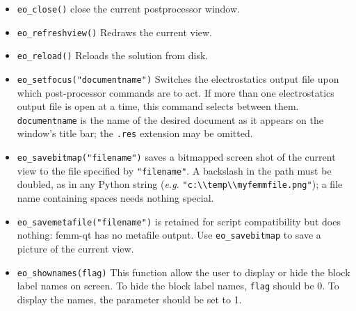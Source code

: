 \begin{itemize}

\item \texttt{eo\_close()} close the current postprocessor window.

\item{\tt eo\_refreshview()} Redraws the current view.

\item{\tt eo\_reload()} Reloads the solution from disk.
\item{\tt eo\_setfocus("documentname")} Switches the electrostatics output
file upon which post-processor commands are to act.  If more than one
electrostatics output file is open at a time, this command selects between them.
{\tt documentname} is the name of the desired document as it appears on the
window's title bar; the {\tt .res} extension may be omitted.

\item \texttt{eo\_savebitmap("filename")} saves a bitmapped screen shot of the current
view to the file specified by {\tt "filename"}.  A backslash in the path
must be doubled, as in any Python string ({\em e.g.}
\verb+"c:\\temp\\myfemmfile.png"+); a file name containing spaces needs
nothing special.
\item \texttt{eo\_savemetafile("filename")} is retained for script
compatibility but does nothing: femm-qt has no metafile output. Use
\texttt{eo\_savebitmap} to save a picture of the current view.

\item \texttt{eo\_shownames(flag)} This function allow the user to display or hide the
block label names on screen. To hide the block label names,
\texttt{flag} should be 0. To display the names, the parameter
should be set to 1.


\end{itemize}
